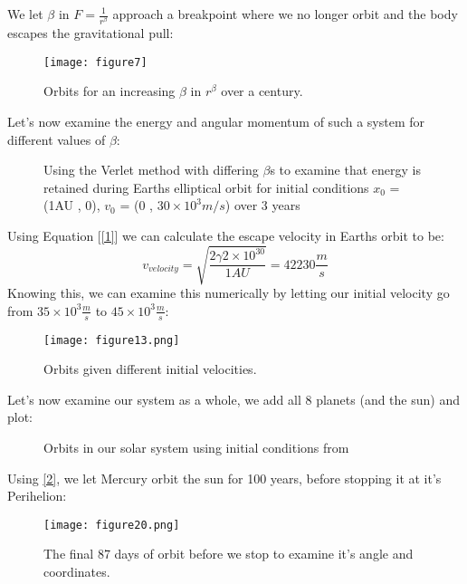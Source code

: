 \documentclass{article}
\begin{document}
We let $\beta$ in $F = \frac{1}{r^\beta}$ approach a breakpoint where we no longer orbit and the body escapes the gravitational pull:
\begin{figure}[ht!]
    \centering
    \texttt{[image: figure7]}
    \caption{Orbits for an increasing $\beta$ in $r^\beta$ over a century.}
    \label{fig3}
\end{figure} \newline
Let's now examine the energy and angular momentum of such a system for different values of $\beta$:
\begin{figure}[ht!] \label{fig4}
\centering
{}
\caption{Using the Verlet method with differing $\beta$s to examine that energy is retained during Earths elliptical orbit for initial conditions $x_0$ = (1AU , 0), $v_0$ = (0 , $30\times 10^3 m/s$) over 3 years}
\end{figure} \newpage
Using Equation [\ref{1}] we can calculate the escape velocity in Earths orbit to be:
\begin{equation*}
    v_{velocity} = \sqrt{\frac{2\gamma 2\times10^30}{1AU}} = 42230 \frac{m}{s}
\end{equation*}
Knowing this, we can examine this numerically by letting our initial velocity go from $35\times 10^3 \frac{m}{s}$ to $45\times 10^3 \frac{m}{s}$:
\begin{figure}[ht!]
    \centering
    \texttt{[image: figure13.png]}
    \caption{Orbits given different initial velocities.}
    \label{fig5}
\end{figure} \newpage
Let's now examine our system as a whole, we add all 8 planets (and the sun) and plot:
\begin{figure}[ht!] 
\centering
{}
\caption{Orbits in our solar system using initial conditions from \cite{NASA}}
\end{figure} \newline
Using \ref{2}, we let Mercury orbit the sun for 100 years, before stopping it at it's Perihelion:
\begin{figure}[ht!]
    \centering
    \texttt{[image: figure20.png]}
    \caption{The final 87 days of orbit before we stop to examine it's angle and coordinates.}
    \label{fig7}
\end{figure} \newpage
\end{document}
